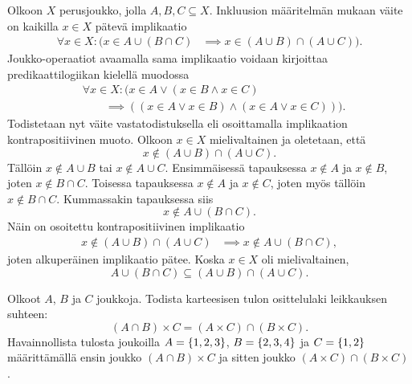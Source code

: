 \documentclass[11pt,a4paper]{amsart}
\begin{document}
\begin{solution}
Olkoon \(X\) perusjoukko, jolla \(A, B, C \subseteq X\).
Inkluusion määritelmän mukaan väite on kaikilla \(x \in X\) pätevä implikaatio
\[
\begin{aligned}
\forall x \in X \colon \bigl(x \in A \cup (B \cap C)
&\implies x \in (A \cup B) \cap (A \cup C)\bigr).
\end{aligned}
\]
Joukko-operaatiot avaamalla sama implikaatio voidaan kirjoittaa
predikaattilogiikan kielellä muodossa
\[
\begin{aligned}
&\forall x \in X \colon \bigl(x \in A \lor (x \in B \land x \in C) \\
&\qquad\implies
\left((x \in A \lor x \in B) \land (x \in A \lor x \in C)\right)\bigr).
\end{aligned}
\]
Todistetaan nyt väite vastatodistuksella eli osoittamalla implikaation
kontrapositiivinen muoto. Olkoon \(x \in X\) mielivaltainen ja oletetaan, että
\[
x \notin (A \cup B) \cap (A \cup C).
\]
Tällöin \(x \notin A \cup B\) tai \(x \notin A \cup C\). Ensimmäisessä
tapauksessa \(x \notin A\) ja \(x \notin B\), joten
\(x \notin B \cap C\). Toisessa tapauksessa \(x \notin A\) ja
\(x \notin C\), joten myös tällöin \(x \notin B \cap C\). Kummassakin
tapauksessa siis
\[
x \notin A \cup (B \cap C).
\]
Näin on osoitettu kontrapositiivinen implikaatio
\[
\begin{aligned}
x \notin (A \cup B) \cap (A \cup C)
&\implies x \notin A \cup (B \cap C),
\end{aligned}
\]
joten alkuperäinen implikaatio pätee.
Koska \(x \in X\) oli mielivaltainen,
\[A \cup (B \cap C) \subseteq (A \cup B) \cap (A \cup C).\]
\end{solution}

\begin{exercise}
Olkoot \(A\), \(B\) ja \(C\) joukkoja. Todista karteesisen tulon osittelulaki
leikkauksen suhteen:
\[
(A \cap B) \times C = (A \times C) \cap (B \times C).
\]
Havainnollista tulosta joukoilla \(A = \left\lbrace1, 2, 3\right\rbrace\), \(B = \left\lbrace2, 3, 4\right\rbrace\)
ja \(C = \left\lbrace1, 2\right\rbrace\) määrittämällä ensin joukko \((A \cap B) \times C\)
ja sitten joukko \((A \times C) \cap (B \times C)\).
\end{exercise}
\end{document}
